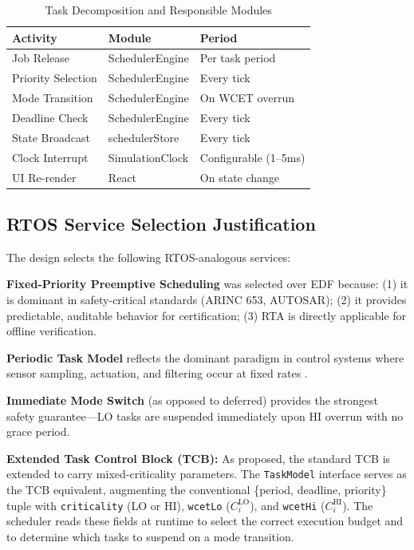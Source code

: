 \documentclass[conference]{IEEEtran}
\begin{document}
\begin{table}[h]
  \caption{Task Decomposition and Responsible Modules}
  \centering
  \begin{tabular}{lll}
    \toprule
    \textbf{Activity} & \textbf{Module} & \textbf{Period} \\
    \midrule
    Job Release & SchedulerEngine & Per task period \\
    Priority Selection & SchedulerEngine & Every tick \\
    Mode Transition & SchedulerEngine & On WCET overrun \\
    Deadline Check & SchedulerEngine & Every tick \\
    State Broadcast & schedulerStore & Every tick \\
    Clock Interrupt & SimulationClock & Configurable (1--5ms) \\
    UI Re-render & React & On state change \\
    \bottomrule
  \end{tabular}
  \label{tab:decomp}
\end{table}

\subsection{RTOS Service Selection Justification}
The design selects the following RTOS-analogous services:

\textbf{Fixed-Priority Preemptive Scheduling} was selected over EDF because: (1) it is dominant in safety-critical standards (ARINC 653, AUTOSAR); (2) it provides predictable, auditable behavior for certification; (3) RTA is directly applicable for offline verification.

\textbf{Periodic Task Model} reflects the dominant paradigm in control systems where sensor sampling, actuation, and filtering occur at fixed rates \cite{buttazzo2011hard}.

\textbf{Immediate Mode Switch} (as opposed to deferred) provides the strongest safety guarantee---LO tasks are suspended immediately upon HI overrun with no grace period.

\textbf{Extended Task Control Block (TCB):} As proposed, the standard TCB is extended to carry mixed-criticality parameters. The \texttt{TaskModel} interface serves as the TCB equivalent, augmenting the conventional \{period, deadline, priority\} tuple with \texttt{criticality} (LO or HI), \texttt{wcetLo} ($C_i^{\text{LO}}$), and \texttt{wcetHi} ($C_i^{\text{HI}}$). The scheduler reads these fields at runtime to select the correct execution budget and to determine which tasks to suspend on a mode transition.
\end{document}
